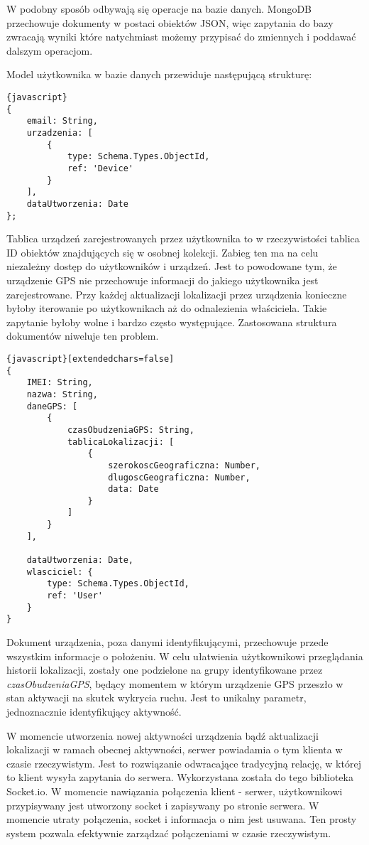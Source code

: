 \documentclass[eng,printmode]{mgr}
\begin{document}
W podobny sposób odbywają się operacje na bazie danych. MongoDB przechowuje dokumenty w postaci obiektów JSON, więc zapytania do bazy zwracają wyniki które natychmiast możemy przypisać do zmiennych i poddawać dalszym operacjom.

Model użytkownika w bazie danych przewiduje następującą strukturę:
\begin{lstlisting}{javascript}
{
    email: String,
    urzadzenia: [
        {
            type: Schema.Types.ObjectId,
            ref: 'Device'
        }
    ],
    dataUtworzenia: Date
};
\end{lstlisting}
Tablica urządzeń zarejestrowanych przez użytkownika to w rzeczywistości tablica ID obiektów znajdujących się w osobnej kolekcji. Zabieg ten ma na celu niezależny dostęp do użytkowników i urządzeń. Jest to powodowane tym, że urządzenie GPS nie przechowuje informacji do jakiego użytkownika jest zarejestrowane. Przy każdej aktualizacji lokalizacji przez urządzenia konieczne byłoby iterowanie po użytkownikach aż do odnalezienia właściciela. Takie zapytanie byłoby wolne i bardzo często występujące. Zastosowana struktura dokumentów niweluje ten problem.

\begin{lstlisting}{javascript}[extendedchars=false]
{
    IMEI: String,
    nazwa: String,
    daneGPS: [
        {
            czasObudzeniaGPS: String,
            tablicaLokalizacji: [
                {
                    szerokoscGeograficzna: Number,
                    dlugoscGeograficzna: Number,                    
                    data: Date
                }
            ]
        }
    ],

    dataUtworzenia: Date,
    wlasciciel: {
        type: Schema.Types.ObjectId,
        ref: 'User'
    }
}
\end{lstlisting}
Dokument urządzenia, poza danymi identyfikującymi, przechowuje przede wszystkim informacje o położeniu. W celu ułatwienia użytkownikowi przeglądania historii lokalizacji, zostały one podzielone na grupy identyfikowane przez \textit{czasObudzeniaGPS}, będący momentem w którym urządzenie GPS przeszło w stan aktywacji na skutek wykrycia ruchu. Jest to unikalny parametr, jednoznacznie identyfikujący aktywność.

W momencie utworzenia nowej aktywności urządzenia bądź aktualizacji lokalizacji w ramach obecnej aktywności, serwer powiadamia o tym klienta w czasie rzeczywistym. Jest to rozwiązanie odwracające tradycyjną relację, w której to klient wysyła zapytania do serwera. Wykorzystana została do tego biblioteka Socket.io. W momencie nawiązania połączenia klient - serwer, użytkownikowi przypisywany jest utworzony socket i zapisywany po stronie serwera. W momencie utraty połączenia, socket i informacja o nim jest usuwana. Ten prosty system pozwala efektywnie zarządzać połączeniami w czasie rzeczywistym.
\end{document}
